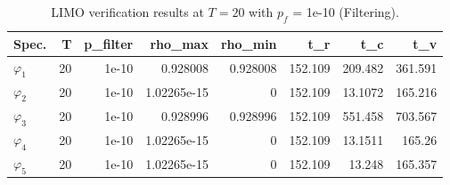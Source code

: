 \begin{table}[t]
\centering
\caption{LIMO verification results at $T=20$ with $p_f$ = 1e-10 (Filtering).}
\label{tab:limo_T20_pf1e-10}
\begin{tabular}{lrrrrrrr}
\toprule
Spec. & T & p_filter & rho_max & rho_min & t_r & t_c & t_v \\
\midrule
$\varphi_1$ & 20 & 1e-10 & 0.928008 & 0.928008 & 152.109 & 209.482 & 361.591 \\
$\varphi_2$ & 20 & 1e-10 & 1.02265e-15 & 0 & 152.109 & 13.1072 & 165.216 \\
$\varphi_3$ & 20 & 1e-10 & 0.928996 & 0.928996 & 152.109 & 551.458 & 703.567 \\
$\varphi_4$ & 20 & 1e-10 & 1.02265e-15 & 0 & 152.109 & 13.1511 & 165.26 \\
$\varphi_5$ & 20 & 1e-10 & 1.02265e-15 & 0 & 152.109 & 13.248 & 165.357 \\
\bottomrule
\end{tabular}

\end{table}
